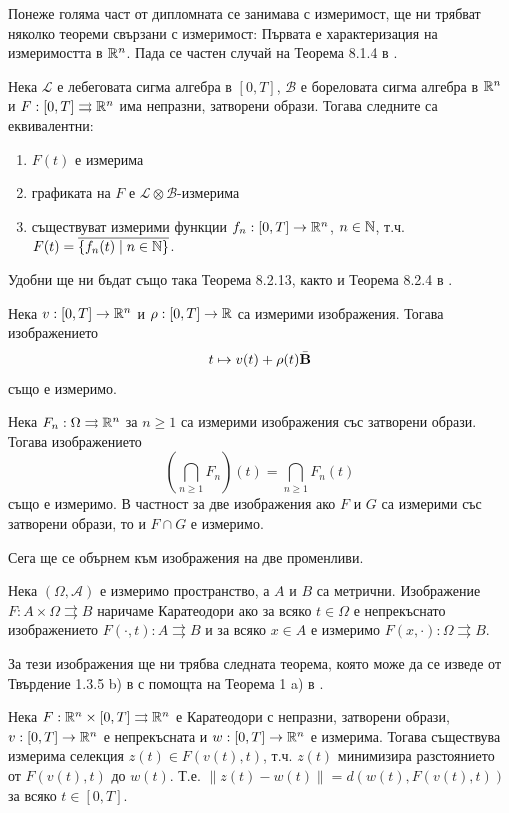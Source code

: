 Понеже голяма част от дипломната се занимава с измеримост, ще ни трябват няколко теореми свързани с измеримост:
Първата е характеризация на измеримостта в $\mathbb{R}^n$. Пада се частен случай на Теорема 8.1.4 в \cite{SetValued}.
\begin{theorem}
    Нека $\mathcal{L}$ е лебеговата сигма алгебра в $[0,T]$, $\mathcal{B}$ е бореловата сигма алгебра в $\mathbb{R}^n$ и $F:[0,T]\rightrightarrows\mathbb{R}^n$ има непразни, затворени образи.
    Тогава следните са еквивалентни:
    \begin{enumerate}
        \item $F(t)$ е измерима
        \item графиката на $F$ е $\mathcal{L}\otimes\mathcal{B}$-измерима
        \item съществуват измерими функции $f_n:[0,T]\to\mathbb{R}^n$, $n\in\mathbb{N}$, т.ч. $F(t)=\overline{\{f_n(t) \mid n\in\mathbb{N}\}}$.
    \end{enumerate}
\end{theorem}
Удобни ще ни бъдат също така Теорема 8.2.13,
както и Теорема 8.2.4 в \cite{SetValued}.

\begin{theorem} \label{MeasurableBall}
    Нека $v:[0,T]\to\mathbb{R}^n$ и $\rho:[0,T]\to\mathbb{R}$ са измерими изображения.
    Тогава изображението
    \[
        t \mapsto v(t) + \rho(t)\bar{\textbf{B}}
    \]
    също е измеримо.\\
\end{theorem}
\begin{theorem} \label{MeasurableCap}
    Нека $F_n:\Omega\rightrightarrows \mathbb{R}^n$ за $n\geq 1$ са измерими изображения със затворени образи. Тогава изображението
    \[
        \left(\bigcap_{n\geq 1}F_n\right)(t) = \bigcap_{n\geq 1}F_n(t)
    \]
    също е измеримо. В частност за две изображения ако $F$ и $G$ са измерими със затворени образи, то и $F\cap G$ е измеримо.
\end{theorem}

Сега ще се обърнем към изображения на две променливи.
\begin{definition}
    Нека $(\Omega, \mathcal{A})$ е измеримо пространство, а $A$ и $B$ са метрични. Изображение $F:A\times\Omega\rightrightarrows B$ наричаме Каратеодори ако за всяко $t\in\Omega$ е непрекъснато изображението $F(\cdot, t):A\rightrightarrows B$ и за всяко $x\in A$ е измеримо $F(x, \cdot):\Omega\rightrightarrows B$.
\end{definition}

За тези изображения ще ни трябва следната теорема, която може да се изведе от Твърдение 1.3.5 b) в \cite{DeimlingMulti} с помощта на Теорема 1 a) в \cite{Scorza-Dragoni}.
\begin{theorem} \label{CompositeSelection}
    Нека $F:\mathbb{R}^n\times [0,T]\rightrightarrows \mathbb{R}^n$ е Каратеодори с непразни, затворени образи, $v:[0,T]\to\mathbb{R}^n$ е непрекъсната и $w:[0,T]\to\mathbb{R}^n$ е измерима. Тогава съществува измерима селекция $z(t)\in F(v(t),t)$, т.ч. $z(t)$ минимизира разстоянието от $F(v(t),t)$ до $w(t)$. Т.е. $\lVert z(t) - w(t)\rVert = d(w(t), F(v(t), t))$ за всяко $t\in [0,T]$.
\end{theorem}

